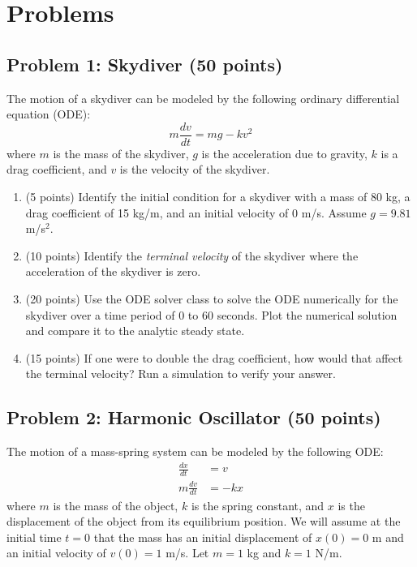\documentclass[12pt]{article}
\begin{document}
\section*{Problems}
\subsection*{Problem 1: Skydiver (50 points)}
The motion of a skydiver can be modeled by the following ordinary differential equation (ODE):
\begin{equation}
    m \frac{dv}{dt} = mg - kv^2
\end{equation}
where $m$ is the mass of the skydiver, $g$ is the acceleration due to gravity, $k$ is a drag coefficient, and $v$ is the velocity of the skydiver.

\begin{enumerate}[label=(\alph*)]
    \item (5 points) Identify the initial condition for a skydiver with a mass of 80 kg, a drag coefficient of 15 kg/m, and an initial velocity of 0 m/s. Assume $g = 9.81$ m/s$^2$.
    \item (10 points) Identify the \textit{terminal velocity} of the skydiver where the acceleration of the skydiver is zero.
    \item (20 points) Use the ODE solver class to solve the ODE numerically for the skydiver over a time period of 0 to 60 seconds. Plot the numerical solution and compare it to the analytic steady state.
    \item (15 points) If one were to double the drag coefficient, how would that affect the terminal velocity? Run a simulation to verify your answer.
\end{enumerate}
\subsection*{Problem 2: Harmonic Oscillator (50 points)}
The motion of a mass-spring system can be modeled by the following ODE:
\begin{align}
    \frac{dx}{dt} &= v \\
    m \frac{dv}{dt} &= -k x
\end{align}
where $m$ is the mass of the object, $k$ is the spring constant, and $x$ is the displacement of the object from its equilibrium position. We will assume at the initial time $t=0$ that the mass has an initial displacement of $x(0) = 0$ m and an initial velocity of $v(0) = 1$ m/s. Let $m = 1$ kg and $k = 1$ N/m.
\end{document}
